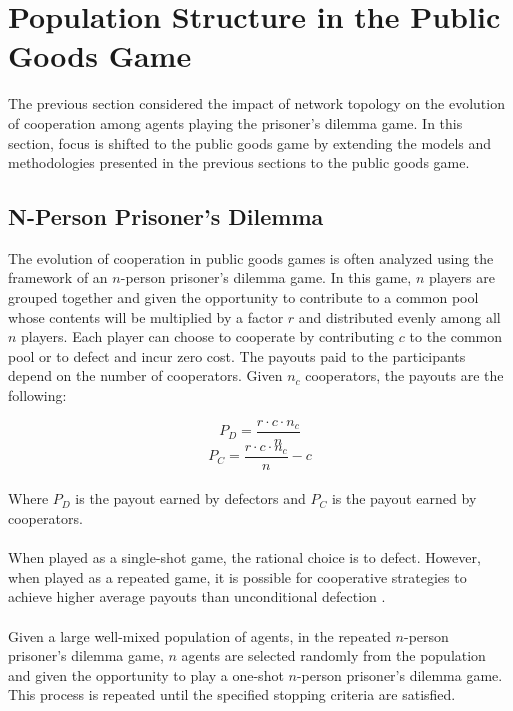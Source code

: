 \documentclass{article}
\begin{document}
	\section{Population Structure in the Public Goods Game}
	The previous section considered the impact of network topology on the evolution of cooperation among agents playing the prisoner's dilemma game.  In this section, focus is shifted to the public goods game by extending the models and methodologies presented in the previous sections to the public goods game.

	\subsection{N-Person Prisoner's Dilemma}
	The evolution of cooperation in public goods games is often analyzed using the framework of an $n$-person prisoner's dilemma game.  In this game, $n$ players are grouped together and given the opportunity to contribute to a common pool whose contents will be multiplied by a factor $r$ and distributed evenly among all $n$ players.  Each player can choose to cooperate by contributing $c$ to the common pool or to defect and incur zero cost.  The payouts paid to the participants depend on the number of cooperators.  Given $n_c$ cooperators, the payouts are the following:

	\begin{equation}
	P_D=\frac{r\cdot c\cdot n_c}{n}
	\end{equation}
	\begin{equation}
	P_C=\frac{r\cdot c\cdot n_c}{n}-c
	\end{equation}

	\paragraph{}Where $P_D$ is the payout earned by defectors and $P_C$ is the payout earned by cooperators.
	\paragraph{}When played as a single-shot game, the rational choice is to defect.  However, when played as a repeated game, it is possible for cooperative strategies to achieve higher average payouts than unconditional defection \cite{Boyd1988}\cite{Boyd1992}\cite{Hauert2002}\cite{Hauert2007}.
	\paragraph{}Given a large well-mixed population of agents, in the repeated $n$-person prisoner's dilemma game, $n$ agents are selected randomly from the population and given the opportunity to play a one-shot $n$-person prisoner's dilemma game.  This process is repeated until the specified stopping criteria are satisfied.
\end{document}

